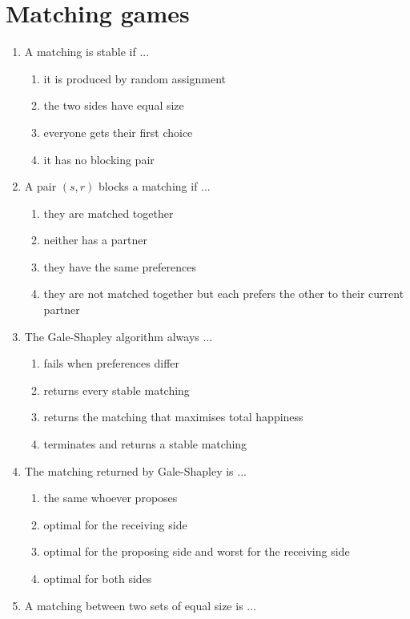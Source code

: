 \documentclass[11pt]{article}
\begin{document}
\section*{Matching games}
\begin{enumerate}[itemsep=6pt]
  \item A matching is stable if ...
  \begin{enumerate}
    \item it is produced by random assignment
    \item the two sides have equal size
    \item everyone gets their first choice
    \item it has no blocking pair
  \end{enumerate}
  \item A pair \((s, r)\) blocks a matching if ...
  \begin{enumerate}
    \item they are matched together
    \item neither has a partner
    \item they have the same preferences
    \item they are not matched together but each prefers the other to their current partner
  \end{enumerate}
  \item The Gale-Shapley algorithm always ...
  \begin{enumerate}
    \item fails when preferences differ
    \item returns every stable matching
    \item returns the matching that maximises total happiness
    \item terminates and returns a stable matching
  \end{enumerate}
  \item The matching returned by Gale-Shapley is ...
  \begin{enumerate}
    \item the same whoever proposes
    \item optimal for the receiving side
    \item optimal for the proposing side and worst for the receiving side
    \item optimal for both sides
  \end{enumerate}
  \item A matching between two sets of equal size is ...
  \begin{enumerate}

\end{enumerate}
\end{enumerate}
\end{document}
